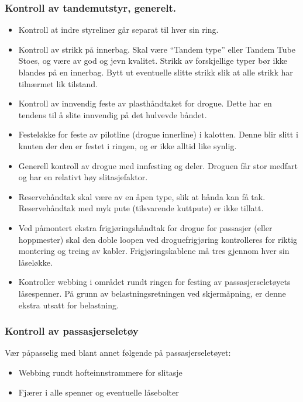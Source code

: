 \subsubsection{Kontroll av tandemutstyr, generelt.}
\begin{itemize}
	\item Kontroll at indre styreliner går separat til hver sin ring.
	\item Kontroll av strikk på innerbag. Skal være ``Tandem type'' eller Tandem Tube Stoes, og være av god og jevn kvalitet. Strikk av forskjellige typer bør ikke blandes på en innerbag. Bytt ut eventuelle slitte strikk slik at alle strikk har tilnærmet lik tilstand.
	\item Kontroll av innvendig feste av plasthåndtaket for drogue. Dette har en tendens til å slite innvendig på det hulvevde båndet.
	\item Festeløkke for feste av pilotline (drogue innerline) i kalotten. Denne blir slitt i knuten der den er festet i ringen, og er ikke alltid like synlig.
	\item Generell kontroll av drogue med innfesting og deler. Droguen får stor medfart og har en relativt høy slitasjefaktor.
	\item Reservehåndtak skal være av en åpen type, slik at hånda kan få tak. Reservehåndtak med myk pute (tilsvarende kuttpute) er ikke tillatt.
	\item Ved påmontert ekstra frigjøringshåndtak for drogue for passasjer (eller hoppmester) skal den doble loopen ved droguefrigjøring kontrolleres for riktig montering og treing av kabler. Frigjøringskablene må tres gjennom hver sin låseløkke.
	\item Kontroller webbing i området rundt ringen for festing av passasjerseletøyets låsespenner. På grunn av belastningsretningen ved skjermåpning, er denne ekstra utsatt for belastning.
\end{itemize}

\subsubsection{Kontroll av passasjerseletøy}
Vær påpasselig med blant annet følgende på passasjerseletøyet:
\begin{itemize}
	\item Webbing rundt hofteinnstrammere for slitasje
	\item Fjærer i alle spenner og eventuelle låsebolter
\end{itemize}


